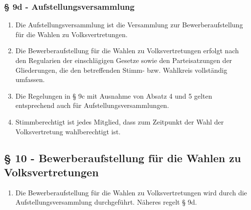 \subsubsection{§ 9d - Aufstellungsversammlung}
\begin{enumerate}
\item Die Aufstellungsversammlung ist die Versammlung zur Bewerberaufstellung
für die Wahlen zu Volksvertretungen.

\item Die Bewerberaufstellung für die Wahlen zu Volksvertretungen erfolgt nach
den Regularien der einschlägigen Gesetze sowie den Parteisatzungen der
Gliederungen, die den betreffenden Stimm- bzw. Wahlkreis vollständig umfassen.

\item Die Regelungen in § 9c mit Ausnahme von Absatz 4 und 5 gelten
entsprechend auch für Aufstellungsversammlungen.

\item Stimmberechtigt ist jedes Mitglied, dass zum Zeitpunkt der Wahl der
Volksvertretung wahlberechtigt ist.
\end{enumerate}

\subsection{§ 10 - Bewerberaufstellung für die Wahlen zu Volksvertretungen}
\begin{enumerate}
\item Die Bewerberaufstellung für die Wahlen zu Volksvertretungen wird durch die
Aufstellungsversammlung durchgeführt. Näheres regelt § 9d.
\end{enumerate}

